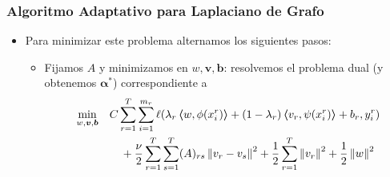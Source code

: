 \documentclass[aspectratio=43]{beamer}
\newcommand{\norm}[1]{\left\lVert#1\right\rVert}
\newcommand{\opt}[1]{{#1}^*}
\newcommand{\upper}[1]{\expandafter\MakeUppercase\expandafter{#1}}
\newcommand{\mymat}[1]{\upper{#1}}
\newcommand{\myvec}[1]{\bm{#1}}
\newcommand{\fv}[1]{\myvec{#1}}
\newcommand{\fm}[1]{\mymat{#1}}
\newcommand{\dotp}[2]{\bm{\left\langle} #1, #2 \bm{\right\rangle}}
\newcommand{\nsamples}{n}
\newcommand{\ntasks}{T}
\newcommand{\npertask}{m}
\newcommand{\lossf}{\ell}
\begin{document}
\begin{frame}
      \frametitle{Algoritmo Adaptativo para Laplaciano de Grafo}

      \begin{itemize}
            \item Para minimizar este problema alternamos los siguientes pasos:
            \begin{itemize}
                  \item Fijamos $A$ y minimizamos en $w, \fv{v}, \fv{b}$: resolvemos el problema dual (y obtenemos $\opt{\fv{\alpha}}$) correspondiente a
                  \begin{equation}\nonumber %
                        \begin{aligned}
                             & \min_{w, \fv{v}, \fv{b}}
                             &                                       & C \sum_{r=1}^\ntasks \sum_{i=1}^{\npertask_r} {\lossf(\lambda_r \dotp{w}{\phi({x}_i^r)} + (1 - \lambda_r) \dotp{{v}_r}{\psi({x}_i^r)} + b_r, y_i^r)}                                                                                                                                                                       \\
                             &                                       &                                                                                                                                                      & \quad + \frac{\nu}{2} \sum_{r=1}^\ntasks \sum_{s=1}^\ntasks (A)_{rs} \norm{{v}_r - v_{s}}^2 + \frac{1}{2} \sum_{r=1}^\ntasks \norm{{v}_r}^2 + \frac{1}{2}\norm{{w}}^2 
                        \end{aligned}
                    \end{equation}

\end{itemize}
\end{itemize}
\end{frame}
\end{document}
